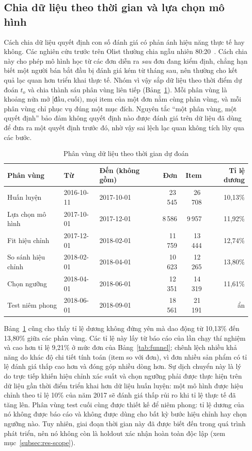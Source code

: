 \subsection{Chia dữ liệu theo thời gian và lựa chọn mô hình}

Cách chia dữ liệu quyết định con số đánh giá có phản ánh hiệu năng thực tế hay không. Các nghiên cứu trước trên Olist thường chia ngẫu nhiên 80:20~\cite{orman2026}. Cách chia này cho phép mô hình học từ các đơn diễn ra \emph{sau} đơn đang kiểm định, chẳng hạn biết một người bán bắt đầu bị đánh giá kém từ tháng sau, nên thường cho kết quả lạc quan hơn triển khai thực tế. Nhóm vì vậy sắp dữ liệu theo thời điểm dự đoán $t_o$ và chia thành sáu phân vùng liên tiếp (Bảng~\ref{tab:split}). Mỗi phân vùng là khoảng nửa mở $[\text{đầu}, \text{cuối})$, mọi item của một đơn nằm cùng phân vùng, và mỗi phân vùng chỉ phục vụ đúng một mục đích. Nguyên tắc ``một phân vùng, một quyết định'' bảo đảm không quyết định nào được đánh giá trên dữ liệu đã dùng để đưa ra một quyết định trước đó, nhờ vậy sai lệch lạc quan không tích lũy qua các bước.

\begin{table}[htbp]\centering\small
\caption{Phân vùng dữ liệu theo thời gian dự đoán}\label{tab:split}
\begin{tabular}{lllrrr}
\toprule
Phân vùng & Từ & Đến (không gồm) & Đơn & Item & Tỉ lệ dương \\
\midrule
Huấn luyện            & 2016-10-11 & 2017-10-01 & 23\,545 & 26\,708 & 10,13\% \\
Lựa chọn mô hình      & 2017-10-01 & 2017-12-01 &  8\,586 &  9\,957 & 11,92\% \\
Fit hiệu chỉnh        & 2017-12-01 & 2018-02-01 & 11\,759 & 13\,444 & 12,74\% \\
So sánh hiệu chỉnh    & 2018-02-01 & 2018-04-01 & 10\,623 & 12\,265 & 13,80\% \\
Chọn ngưỡng           & 2018-04-01 & 2018-06-01 & 12\,351 & 14\,319 & 11,61\% \\
Test niêm phong       & 2018-06-01 & 2018-09-01 & 18\,561 & 21\,191 & ẩn \\
\bottomrule
\end{tabular}
\end{table}

Bảng~\ref{tab:split} cũng cho thấy tỉ lệ dương không đứng yên mà dao động từ 10,13\% đến 13,80\% giữa các phân vùng. Các tỉ lệ này lấy từ báo cáo của lần chạy thí nghiệm và cao hơn tỉ lệ 9,21\% ở mức đơn của Bảng~\ref{tab:funnel}; chênh lệch nhiều khả năng do khác độ chi tiết tính toán (item so với đơn), vì đơn nhiều sản phẩm có tỉ lệ đánh giá thấp cao hơn và đóng góp nhiều dòng hơn. Sự dịch chuyển này là lý do trực tiếp khiến hiệu chỉnh xác suất và chọn ngưỡng phải được thực hiện trên dữ liệu gần thời điểm triển khai hơn dữ liệu huấn luyện: một mô hình được hiệu chỉnh theo tỉ lệ 10\% của năm 2017 sẽ đánh giá thấp rủi ro khi tỉ lệ thực tế đã tăng lên. Phân vùng test cuối cùng được thiết kế để niêm phong: tỉ lệ dương của nó không được báo cáo và không được dùng cho bất kỳ bước hiệu chỉnh hay chọn ngưỡng nào. Tuy nhiên, giai đoạn thời gian này đã được biết đến trong quá trình phát triển, nên nó không còn là holdout xác nhận hoàn toàn độc lập (xem mục~\ref{subsec:res-scope}).


